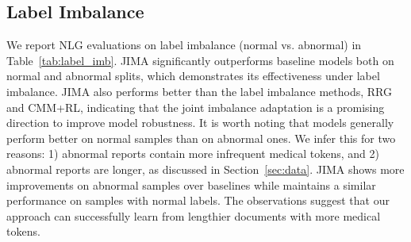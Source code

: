 \documentclass[sn-mathphys-num]{sn-jnl}%
\theoremstyle{thmstyleone}%
\theoremstyle{thmstyletwo}%
\theoremstyle{thmstylethree}%
\begin{document}
\subsection{Label Imbalance}
\label{subsec:label_imb_perf}
We report NLG evaluations on label imbalance (normal vs. abnormal) in Table~\ref{tab:label_imb}.
JIMA significantly outperforms baseline models both on normal and abnormal splits, which demonstrates its effectiveness under label imbalance.
JIMA also performs better than the label imbalance methods, RRG and CMM+RL, indicating that the joint imbalance adaptation is a promising direction to improve model robustness. 
It is worth noting that models generally perform better on normal samples than on abnormal ones. 
We infer this for two reasons: 1) abnormal reports contain more infrequent medical tokens, and 2) abnormal reports are longer, as discussed in Section~\ref{sec:data}. 
JIMA shows more improvements on abnormal samples over baselines while maintains a similar performance on samples with normal labels.
The observations suggest that our approach can successfully learn from lengthier documents with more medical tokens. 
\end{document}
